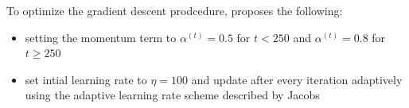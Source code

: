 To optimize the gradient descent prodcedure, \cite{vdMaa08} proposes the following: 
\begin{itemize}
    \item setting the momentum term to $\alpha^{(t)} = 0.5$ for $t<250$ and $\alpha^{(t)} = 0.8$ for $t \geq 250$
    \item set intial learning rate to $\eta = 100$ and update after every iteration adaptively using the adaptive learning rate scheme described by Jacobs \cite{Jacobs1988}
\end{itemize}


